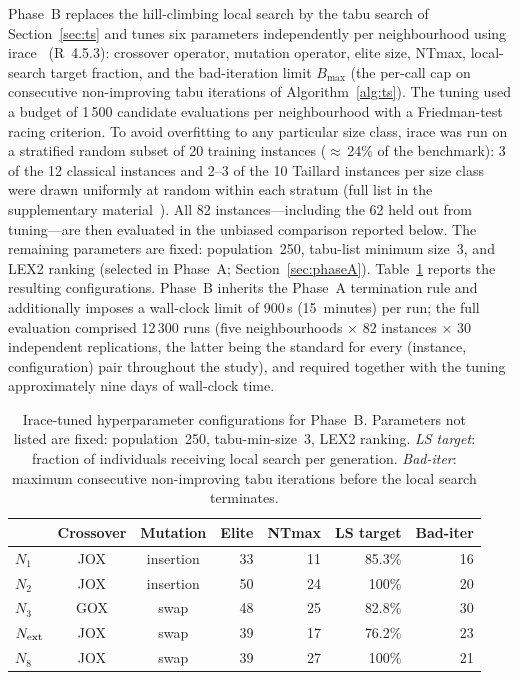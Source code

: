 \documentclass[preprint,12pt]{elsarticle}
\begin{document}
Phase~B replaces the hill-climbing local search by the tabu search of Section~\ref{sec:ts} and tunes six parameters independently per neighbourhood using irace~\cite{Lopez2016} (R~4.5.3): crossover operator, mutation operator, elite size, NTmax, local-search target fraction, and the bad-iteration limit $B_{\max}$ (the per-call cap on consecutive non-improving tabu iterations of Algorithm~\ref{alg:ts}). The tuning used a budget of 1\,500 candidate evaluations per neighbourhood with a Friedman-test racing criterion. To avoid overfitting to any particular size class, irace was run on a stratified random subset of 20 training instances ($\approx$\,24\% of the benchmark): 3 of the 12 classical instances and 2--3 of the 10 Taillard instances per size class were drawn uniformly at random within each stratum (full list in the supplementary material~\cite{DiazSupp2026}). All 82 instances---including the 62 held out from tuning---are then evaluated in the unbiased comparison reported below. The remaining parameters are fixed: population~250, tabu-list minimum size~3, and LEX2 ranking (selected in Phase~A; Section~\ref{sec:phaseA}). Table~\ref{tab:tuned} reports the resulting configurations. Phase~B inherits the Phase~A termination rule and additionally imposes a wall-clock limit of 900\,s (15~minutes) per run; the full evaluation comprised 12\,300 runs (five neighbourhoods $\times$ 82 instances $\times$ 30 independent replications, the latter being the standard for every (instance, configuration) pair throughout the study), and required together with the tuning approximately nine days of wall-clock time.

\begin{table}[htbp]
\centering
\caption{Irace-tuned hyperparameter configurations for Phase~B. Parameters not listed are fixed: population~250, tabu-min-size~3, LEX2 ranking. \emph{LS target}: fraction of individuals receiving local search per generation. \emph{Bad-iter}: maximum consecutive non-improving tabu iterations before the local search terminates.}
\label{tab:tuned}
\begin{tabular}{l c c r r r r}
\hline
 & Crossover & Mutation & Elite & NTmax & LS target & Bad-iter \\
\hline
$N_1$         & JOX & insertion & 33 & 11 & 85.3\% & 16 \\
$N_2$         & JOX & insertion & 50 & 24 & 100\%  & 20 \\
$N_3$         & GOX & swap      & 48 & 25 & 82.8\% & 30 \\
$N_{\rm ext}$ & JOX & swap      & 39 & 17 & 76.2\% & 23 \\
$N_8$         & JOX & swap      & 39 & 27 & 100\%  & 21 \\
\hline
\end{tabular}
\end{table}
\end{document}
